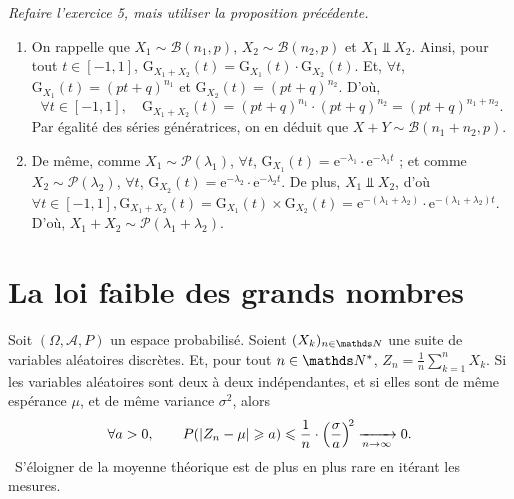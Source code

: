 \begin{exo}
	\textsl{Refaire l'exercice 5, mais utiliser la proposition précédente.}

	\begin{enumerate}
		\item On rappelle que $X_1 \sim \mathcal{B}(n_1,p)$, $X_2 \sim \mathcal{B}(n_2, p)$ et $X_1 \mathrel\Bot X_2$.
			Ainsi, pour tout $t \in [-1,1]$, $\mathrm{G}_{X_1 + X_2}(t) = \mathrm{G}_{X_1}(t) \cdot \mathrm{G}_{X_2}(t)$.
			Et, $\forall t$, $\mathrm{G}_{X_1}(t) = (pt + q)^{n_1}$ et $\mathrm{G}_{X_2}(t) = (pt + q)^{n_2}$.
			D'où, \[
				\forall t \in [-1,1],\quad \mathrm{G}_{X_1+X_2}(t) = (pt+q)^{n_1} \cdot (pt + q)^{n_2} = (pt + q)^{n_1+n_2}
			.\]
			Par égalité des séries génératrices\footnotemark, on en déduit que $X+Y \sim \mathcal{B}(n_1+n_2, p)$.
		\item De même, comme $X_1 \sim \mathcal{P}(\lambda_1)$, $\forall t$, $\mathrm{G}_{X_1}(t) = \mathrm{e}^{-\lambda_1} \cdot \mathrm{e}^{-\lambda_1 t}$ ; et comme $X_2 \sim \mathcal{P}(\lambda_2)$, $\forall t$, $\mathrm{G}_{X_2}(t) = \mathrm{e}^{-\lambda_2} \cdot \mathrm{e}^{-\lambda_2 t}$.
			De plus, $X_1 \mathrel\Bot X_2$, d'où $\forall t \in [-1,1], \mathrm{G}_{X_1+X_2}(t) = \mathrm{G}_{X_1}(t) \times \mathrm{G}_{X_2}(t) = \mathrm{e}^{-(\lambda_1 + \lambda_2)} \cdot \mathrm{e}^{-(\lambda_1 + \lambda_2) t}$.
			D'où, $X_1 + X_2 \sim \mathcal{P}(\lambda_1 + \lambda_2)$.
	\end{enumerate}
\end{exo}

\section{La loi faible des grands nombres}

\begin{thm}
	Soit $(\Omega, \mathcal{A}, P)$ un espace probabilisé. Soient $(X_k)_{n \in \N}$ une suite de variables aléatoires discrètes. Et, pour tout $n \in \N^*$, $Z_n = \frac{1}{n} \sum_{k=1}^n X_k$. Si les variables aléatoires sont deux à deux indépendantes, et si elles sont de même espérance $\mu$, et de même variance $\sigma^2$, alors \[
		\forall a > 0, \quad\quad P(|Z_n - \mu| \geqslant a) \leqslant \frac{1}{n} \cdot \left( \frac{\sigma}{a} \right)^{\!2} \xrightarrow[n\to \infty]{} 0
	.\]%
	\guillemotleft~S'éloigner de la moyenne théorique est de plus en plus rare en itérant les mesures.~\guillemotright
\end{thm}

